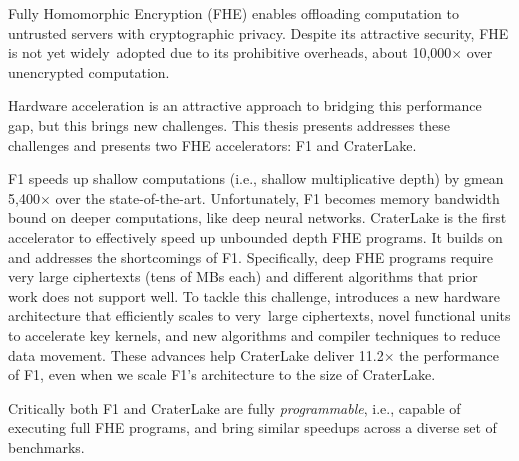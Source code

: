 Fully Homomorphic Encryption (FHE) enables offloading computation to untrusted
servers with cryptographic privacy. Despite its attractive security, FHE is not
yet widely~adopted due to its prohibitive overheads, about 10,000$\times$ over
unencrypted computation.

Hardware acceleration is an attractive approach to bridging this performance
gap, but this brings new challenges. This thesis presents addresses these
challenges and presents two FHE accelerators: F1 and CraterLake.

F1 speeds up shallow computations (i.e., shallow multiplicative depth) by gmean
5,400$\times$ over the state-of-the-art. Unfortunately, F1 becomes memory
bandwidth bound on deeper computations, like deep neural networks. CraterLake
is the first accelerator to effectively speed up unbounded depth FHE programs.
It builds on and addresses the shortcomings of F1. Specifically, deep FHE
programs require very large ciphertexts (tens of MBs each) and different
algorithms that prior work does not support well. To tackle this challenge,
\name introduces a new hardware architecture that efficiently scales to
very~large ciphertexts, novel functional units to accelerate key kernels, and
new algorithms and compiler techniques to reduce data movement. These advances
help CraterLake deliver 11.2$\times$ the performance of F1, even when we scale
F1's architecture to the size of CraterLake.

Critically both F1 and CraterLake are fully \emph{programmable}, i.e., capable
of executing full FHE programs, and bring similar speedups across a diverse set
of benchmarks.
